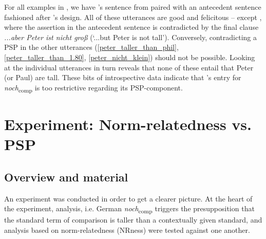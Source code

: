 \documentclass[output=paper]{langsci/langscibook}
\begin{document}
\ea \label{ub_hs_all} 
\z\z

For all examples in , we have \citeauthor{Hofstetter2013}'s sentence from  paired with an antecedent sentence fashioned after \citeauthor{umbach2009a_comp}'s design. All of these utterances are good and felicitous -- except , where the assertion in the antecedent sentence is contradicted by the final clause \textit{...aber Peter ist nicht groß} (`...but Peter is not tall'). Conversely, contradicting a PSP in the other utterances (\ref{peter_taller_than_phil}, \ref{peter_taller_than_1.80}, \ref{peter_nicht_klein}) should not be possible. Looking at the individual utterances in turn reveals that none of these entail that Peter (or Paul) are tall. These bits of introspective data indicate that \citeauthor{Hofstetter2013}'s entry for \textit{noch}\textsubscript{comp} is too restrictive regarding its PSP-component.


\section{Experiment: Norm-relatedness vs. PSP}\label{sec_experiment}
\subsection{Overview and material}

An experiment was conducted in order to get a clearer picture. At the heart of the experiment,  analysis, i.e.  German \textit{noch}\textsubscript{comp} triggers the presupposition that the standard term of comparison is taller than a contextually given standard, and  analysis based on norm-relatedness (NRness) were tested against one another.
\end{document}
